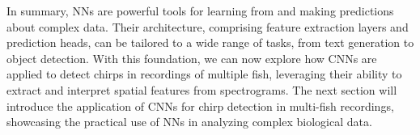 In summary, NNs are powerful tools for learning from and making predictions
about complex data. Their architecture, comprising feature extraction layers
and prediction heads, can be tailored to a wide range of tasks, from text
generation to object detection. With this foundation, we can now explore how
CNNs are applied to detect chirps in recordings of multiple fish, leveraging
their ability to extract and interpret spatial features from spectrograms. The
next section will introduce the application of CNNs for chirp detection in
multi-fish recordings, showcasing the practical use of NNs in analyzing complex
biological data.

%
%
%
